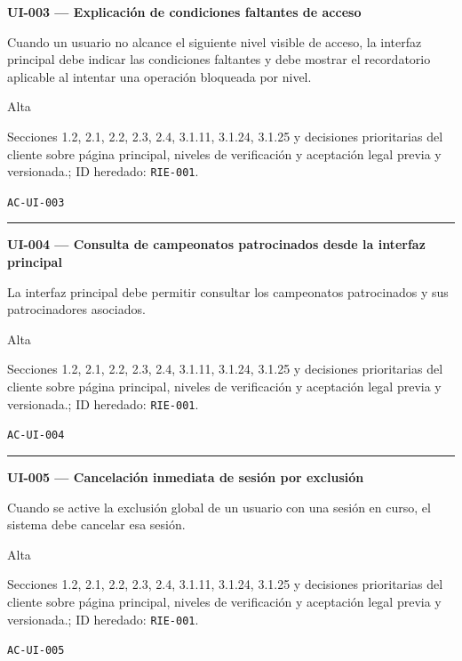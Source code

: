 \documentclass[10pt,letterpaper]{article}
\begin{document}
\noindent\textbf{UI-003 --- Explicación de condiciones faltantes de acceso}\par
\begin{description}[style=nextline,leftmargin=3.15cm,labelwidth=2.8cm,font=\normalfont\bfseries]
\item[Obligación] Cuando un usuario no alcance el siguiente nivel visible de acceso, la interfaz principal debe indicar las condiciones faltantes y debe mostrar el recordatorio aplicable al intentar una operación bloqueada por nivel.
\item[Prioridad] Alta
\item[Procedencia] Secciones 1.2, 2.1, 2.2, 2.3, 2.4, 3.1.11, 3.1.24, 3.1.25 y decisiones prioritarias del cliente sobre página principal, niveles de verificación y aceptación legal previa y versionada.; ID heredado: \texttt{RIE-001}.
\item[Verificación] \texttt{AC-UI-003}
\end{description}
\vspace{0.25em}\hrule\vspace{0.65em}
\noindent\textbf{UI-004 --- Consulta de campeonatos patrocinados desde la interfaz principal}\par
\begin{description}[style=nextline,leftmargin=3.15cm,labelwidth=2.8cm,font=\normalfont\bfseries]
\item[Obligación] La interfaz principal debe permitir consultar los campeonatos patrocinados y sus patrocinadores asociados.
\item[Prioridad] Alta
\item[Procedencia] Secciones 1.2, 2.1, 2.2, 2.3, 2.4, 3.1.11, 3.1.24, 3.1.25 y decisiones prioritarias del cliente sobre página principal, niveles de verificación y aceptación legal previa y versionada.; ID heredado: \texttt{RIE-001}.
\item[Verificación] \texttt{AC-UI-004}
\end{description}
\vspace{0.25em}\hrule\vspace{0.65em}
\noindent\textbf{UI-005 --- Cancelación inmediata de sesión por exclusión}\par
\begin{description}[style=nextline,leftmargin=3.15cm,labelwidth=2.8cm,font=\normalfont\bfseries]
\item[Obligación] Cuando se active la exclusión global de un usuario con una sesión en curso, el sistema debe cancelar esa sesión.
\item[Prioridad] Alta
\item[Procedencia] Secciones 1.2, 2.1, 2.2, 2.3, 2.4, 3.1.11, 3.1.24, 3.1.25 y decisiones prioritarias del cliente sobre página principal, niveles de verificación y aceptación legal previa y versionada.; ID heredado: \texttt{RIE-001}.
\item[Verificación] \texttt{AC-UI-005}
\end{description}
\end{document}

